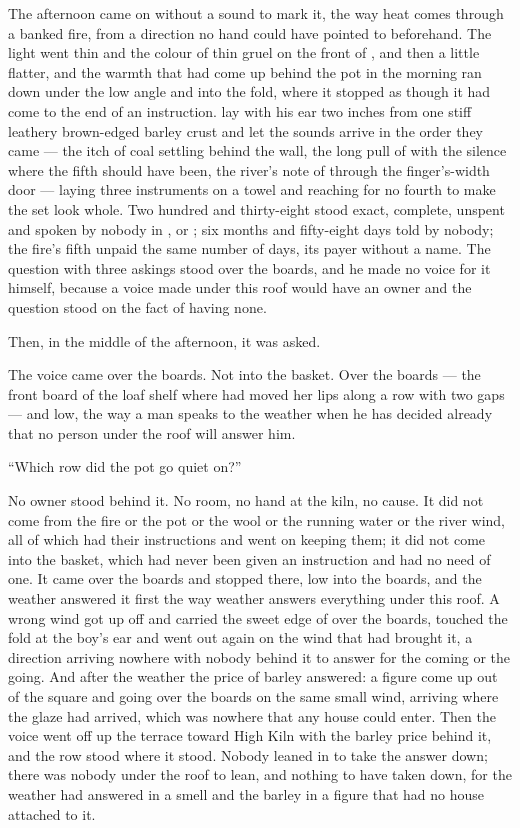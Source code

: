 The afternoon came on without a sound to mark it, the way heat comes through a banked fire, from a direction no hand could have pointed to beforehand. The light went thin and the colour of thin gruel on the front of , and then a little flatter, and the warmth that had come up behind the pot in the morning ran down under the low angle and into the fold, where it stopped as though it had come to the end of an instruction.  lay with his ear two inches from one stiff leathery brown-edged barley crust and let the sounds arrive in the order they came --- the itch of coal settling behind the wall, the long pull of  with the silence where the fifth should have been, the river's note of  through the finger's-width door --- laying three instruments on a towel and reaching for no fourth to make the set look whole. Two hundred and thirty-eight stood exact, complete, unspent and spoken by nobody in ,  or ; six months and fifty-eight days told by nobody; the fire's fifth unpaid the same number of days, its payer without a name. The question with three askings stood over the boards, and he made no voice for it himself, because a voice made under this roof would have an owner and the question stood on the fact of having none.

Then, in the middle of the afternoon, it was asked.

The voice came over the boards. Not into the basket. Over the boards --- the front board of the loaf shelf where  had moved her lips along a row with two gaps --- and low, the way a man speaks to the weather when he has decided already that no person under the roof will answer him.

“Which row did the pot go quiet on?”

No owner stood behind it. No room, no hand at the kiln, no cause. It did not come from the fire or the pot or the wool or the running water or the river wind, all of which had their instructions and went on keeping them; it did not come into the basket, which had never been given an instruction and had no need of one. It came over the boards and stopped there, low into the boards, and the weather answered it first the way weather answers everything under this roof. A wrong wind got up off  and carried the sweet edge of  over the boards, touched the fold at the boy's ear and went out again on the wind that had brought it, a direction arriving nowhere with nobody behind it to answer for the coming or the going. And after the weather the price of barley answered: a figure come up out of the square and going over the boards on the same small wind, arriving where the glaze had arrived, which was nowhere that any house could enter. Then the voice went off up the terrace toward High Kiln with the barley price behind it, and the row stood where it stood. Nobody leaned in to take the answer down; there was nobody under the roof to lean, and nothing to have taken down, for the weather had answered in a smell and the barley in a figure that had no house attached to it.

